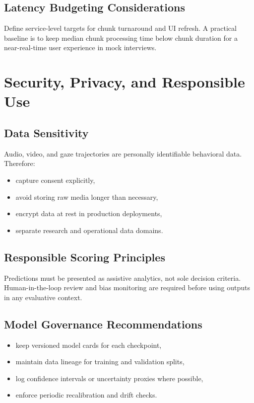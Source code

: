 \documentclass[12pt,a4paper]{report}
\begin{document}
\section{Latency Budgeting Considerations}
Define service-level targets for chunk turnaround and UI refresh. A practical baseline is to keep median chunk processing time below chunk duration for a near-real-time user experience in mock interviews.

\chapter{Security, Privacy, and Responsible Use}
\section{Data Sensitivity}
Audio, video, and gaze trajectories are personally identifiable behavioral data. Therefore:
\begin{itemize}[leftmargin=1.5em]
\item capture consent explicitly,
\item avoid storing raw media longer than necessary,
\item encrypt data at rest in production deployments,
\item separate research and operational data domains.
\end{itemize}

\section{Responsible Scoring Principles}
Predictions must be presented as assistive analytics, not sole decision criteria. Human-in-the-loop review and bias monitoring are required before using outputs in any evaluative context.

\section{Model Governance Recommendations}
\begin{itemize}[leftmargin=1.5em]
\item keep versioned model cards for each checkpoint,
\item maintain data lineage for training and validation splits,
\item log confidence intervals or uncertainty proxies where possible,
\item enforce periodic recalibration and drift checks.
\end{itemize}
\end{document}
